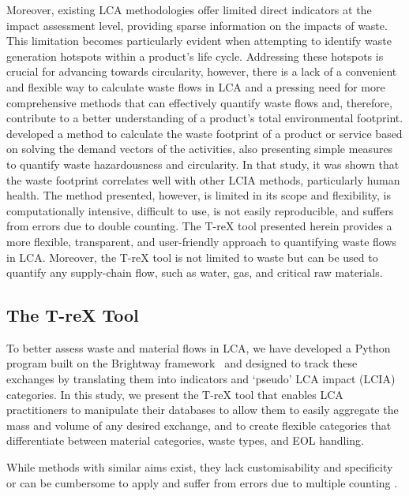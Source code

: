Moreover, existing LCA methodologies offer limited direct indicators at the impact assessment level, providing sparse information on the impacts of waste. This limitation becomes particularly evident when attempting to identify waste generation hotspots within a product's life cycle. Addressing these hotspots is crucial for advancing towards circularity, however,  there is a lack of a convenient and flexible way to calculate waste flows in LCA and a pressing need for more comprehensive methods that can effectively quantify waste flows and, therefore, contribute to a better understanding of a product's total environmental footprint.
\cite{laurenti2023wastefootprint} developed a method to calculate the waste footprint of a product or service based on solving the demand vectors of the activities, also presenting simple measures to quantify waste hazardousness and circularity. In that study, it was shown that the waste footprint correlates well with other LCIA methods, particularly human health. The method presented, however, is limited in its scope and flexibility, is computationally intensive, difficult to use, is not easily reproducible, and suffers from errors due to double counting. The T-reX tool presented herein provides a more flexible, transparent, and user-friendly approach to quantifying waste flows in LCA. Moreover, the T-reX tool is not limited to waste but can be used to quantify any supply-chain flow, such as water, gas, and critical raw materials. 

\subsection{The T-reX Tool}

To better assess waste and material flows in LCA, we have developed a Python program built on the Brightway framework~\citep{mutel2017brightway} and designed to track these exchanges by translating them into indicators and `pseudo' LCA impact (LCIA) categories. In this study, we present the T-reX tool that enables LCA practitioners to manipulate their databases to allow them to easily aggregate the mass and volume of any desired exchange, and to create flexible categories that differentiate between material categories, waste types, and EOL handling.

While methods with similar aims exist, they lack customisability and specificity \citep{foen2021ecofactors} or can be cumbersome to apply and suffer from errors due to multiple counting \citep{laurenti2023wastefootprint}.

